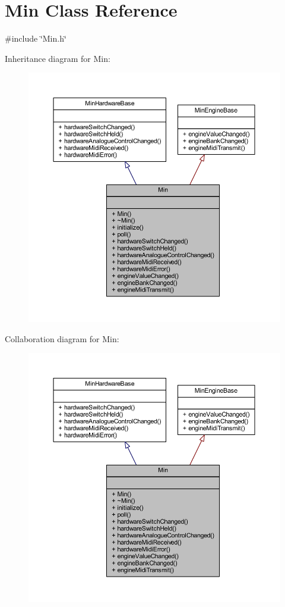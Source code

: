 \hypertarget{class_min}{}\section{Min Class Reference}
\label{class_min}


{\ttfamily \#include \char`\"{}Min.\+h\char`\"{}}



Inheritance diagram for Min\+:
\nopagebreak
\begin{figure}[H]
\begin{center}
\leavevmode
\includegraphics[width=350pt]{d8/d84/class_min__inherit__graph}
\end{center}
\end{figure}


Collaboration diagram for Min\+:
\nopagebreak
\begin{figure}[H]
\begin{center}
\leavevmode
\includegraphics[width=350pt]{d4/d98/class_min__coll__graph}
\end{center}
\end{figure}
